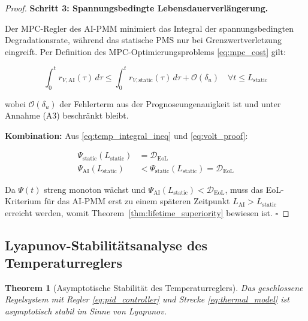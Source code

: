 ﻿\documentclass[12pt,a4paper]{article}
\newtheorem{theorem}{Theorem}[section]
\begin{document}
\begin{proof}
		\textbf{Schritt 3: Spannungsbedingte Lebensdauerverlängerung.}
		
		Der MPC-Regler des AI-PMM minimiert das Integral der spannungsbedingten
		Degradationsrate, während das statische PMS nur bei Grenzwertverletzung
		eingreift. Per Definition des MPC-Optimierungsproblems \eqref{eq:mpc_cost}
		gilt:
		
		\begin{equation}
			\int_0^{t} r_{V,\mathrm{AI}}(\tau)\,d\tau \leq
			\int_0^{t} r_{V,\mathrm{static}}(\tau)\,d\tau + \mathcal{O}(\delta_u)
			\quad \forall t \leq L_\mathrm{static}
			\label{eq:volt_proof}
		\end{equation}
		
		wobei $\mathcal{O}(\delta_u)$ der Fehlerterm aus der Prognoseungenauigkeit ist
		und unter Annahme (A3) beschränkt bleibt.
		
		\textbf{Kombination:} Aus \eqref{eq:temp_integral_ineq} und \eqref{eq:volt_proof}:
		
		\begin{align}
			\Psi_\mathrm{static}(L_\mathrm{static}) &= \mathcal{D}_\mathrm{EoL} \\
			\Psi_\mathrm{AI}(L_\mathrm{static}) &< \Psi_\mathrm{static}(L_\mathrm{static})
			= \mathcal{D}_\mathrm{EoL}
		\end{align}
		
		Da $\Psi(t)$ streng monoton wächst und $\Psi_\mathrm{AI}(L_\mathrm{static}) <
		\mathcal{D}_\mathrm{EoL}$, muss das EoL-Kriterium für das AI-PMM erst zu einem
		späteren Zeitpunkt $L_\mathrm{AI} > L_\mathrm{static}$ erreicht werden, womit
		Theorem~\ref{thm:lifetime_superiority} bewiesen ist. \hfill$\square$
	\end{proof}
	
	\subsection{Lyapunov-Stabilitätsanalyse des Temperaturreglers}
	
	\begin{theorem}[Asymptotische Stabilität des Temperaturreglers]
		\label{thm:lyapunov}
		Das geschlossene Regelsystem mit Regler \eqref{eq:pid_controller} und Strecke
		\eqref{eq:thermal_model} ist asymptotisch stabil im Sinne von Lyapunov.
	\end{theorem}
	
\end{document}
